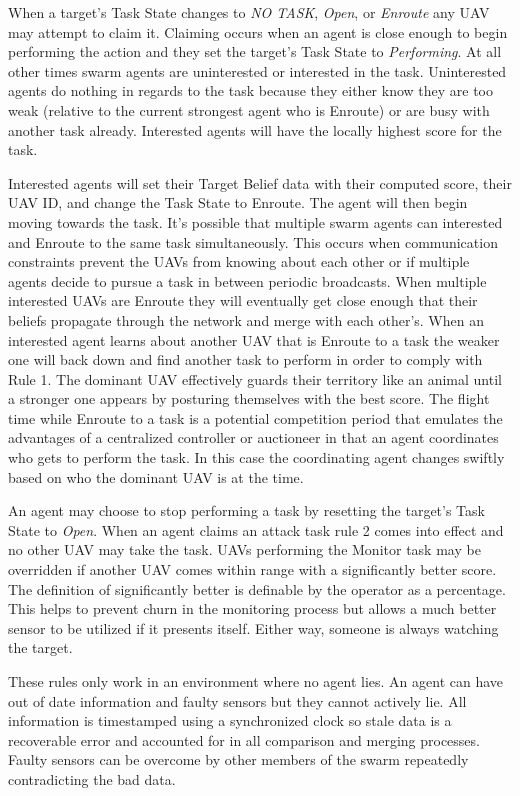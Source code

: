 When a target's Task State changes to \textit{NO TASK}, \textit{Open}, or \textit{Enroute} any UAV may attempt to claim it.  Claiming occurs when an agent is close enough to begin performing the action and they set the target's Task State to \textit{Performing}.  At all other times swarm agents are uninterested or interested in the task.  Uninterested agents do nothing in regards to the task because they either know they are too weak (relative to the current strongest agent who is Enroute) or are busy with another task already.  Interested agents will have the locally highest score for the task.  

Interested agents will set their Target Belief data with their computed score, their UAV ID, and change the Task State to Enroute.  The agent will then begin moving towards the task.  It's possible that multiple swarm agents can interested and Enroute to the same task simultaneously.  This occurs when communication constraints prevent the UAVs from knowing about each other or if multiple agents decide to pursue a task in between periodic broadcasts.  When multiple interested UAVs are Enroute they will eventually get close enough that their beliefs propagate through the network and merge with each other's.  When an interested agent learns about another UAV that is Enroute to a task the weaker one will back down and find another task to perform in order to comply with Rule 1.  The dominant UAV effectively guards their territory like an animal until a stronger one appears by posturing themselves with the best score.  The flight time while Enroute to a task is a potential competition period that emulates the advantages of a centralized controller or auctioneer in that an agent coordinates who gets to perform the task.  In this case the coordinating agent changes swiftly based on who the dominant UAV is at the time.

An agent may choose to stop performing a task by resetting the target's Task State to \textit{Open}.  When an agent claims an attack task rule 2 comes into effect and no other UAV may take the task.  UAVs performing the Monitor task may be overridden if another UAV comes within range with a significantly better score.  The definition of significantly better is definable by the operator as a percentage.   This helps to prevent churn in the monitoring process but allows a much better sensor to be utilized if it presents itself.  Either way, someone is always watching the target.

These rules only work in an environment where no agent lies.  An agent can have out of date information and faulty sensors but they cannot actively lie.  All information is timestamped using a synchronized clock so stale data is a recoverable error and accounted for in all comparison and merging processes.  Faulty sensors can be overcome by other members of the swarm repeatedly contradicting the bad data.

